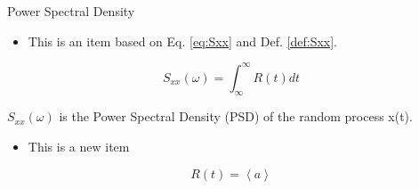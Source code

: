 \documentclass{beamer}
\begin{document}
\begin{frame}{Power Spectral Density}

\begin{itemize}
\item This is an item based on Eq. \ref{eq:Sxx} and Def. \ref{def:Sxx}.
\end{itemize}
\begin{equation}
S_{xx}(\omega)=\int_{\infty}^{\infty}R(t)dt
\label{eq:Sxx}
\end{equation}

\begin{Definition}
$S_{xx}(\omega)$ is the Power Spectral Density (PSD) of the random process x(t). 
\label{def:Sxx}
\end{Definition}

\label{fr:1}
\end{frame}

\begin{frame}{}
\begin{itemize}
\item This is a new item
\end{itemize}

\begin{equation}
R(t)=\left<a\right>
\end{equation}

\end{frame}
\begin{frame}

\end{frame}
\end{document}
